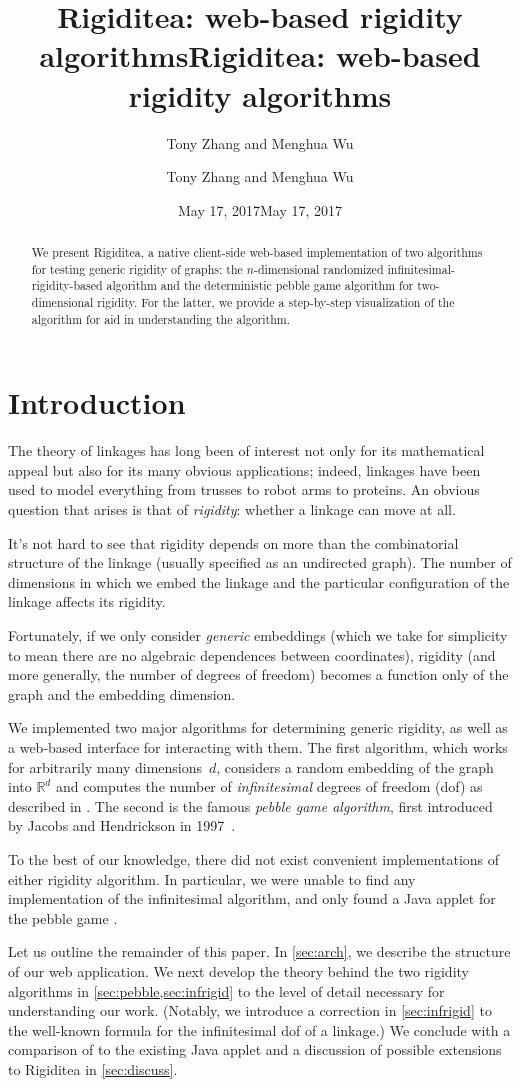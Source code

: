 \documentclass[aps,prd,final,twocolumn,letterpaper,nofootinbib]{revtex4-1}
\title{Rigiditea: web-based rigidity algorithms}
\author{Tony Zhang and Menghua Wu}
\date{May 17, 2017}
\newcommand\RR{\mathbb{R}}
\newcommand\headers{
    \title{Rigiditea: web-based rigidity algorithms}
    \author{Tony Zhang and Menghua Wu}
    \date{May 17, 2017}    
    \begin{abstract}
        We present Rigiditea,
        a native client-side web-based implementation of two algorithms
        for testing generic rigidity of graphs:
        the $n$-dimensional randomized infinitesimal-rigidity-based algorithm
        and the deterministic pebble game algorithm for two-dimensional rigidity.
        For the latter, we provide a step-by-step visualization of the algorithm
        for aid in understanding the algorithm.
    \end{abstract}
}
\begin{document}
\ifrevtex\headers\fi

\maketitle




\tableofcontents

\section{Introduction}

The theory of linkages has long been of interest
not only for its mathematical appeal
but also for its many obvious applications;
indeed, linkages have been used to model everything
from trusses to robot arms to proteins.
An obvious question that arises is that of \emph{rigidity}:
whether a linkage can move at all.

It's not hard to see that rigidity depends on more than
the combinatorial structure of the linkage
(usually specified as an undirected graph).
The number of dimensions in which we embed the linkage
and the particular configuration of the linkage
affects its rigidity.

Fortunately, if we only consider \emph{generic} embeddings
(which we take for simplicity to mean
there are no algebraic dependences between coordinates),
rigidity (and more generally, the number of degrees of freedom)
becomes a function only of the graph and the embedding dimension.

We implemented two major algorithms for determining generic rigidity,
as well as a web-based interface for interacting with them.
The first algorithm, which works for arbitrarily many dimensions~$d$,
considers a random embedding of the graph into $\RR^d$
and computes the number of \emph{infinitesimal} degrees of freedom (dof)
as described in \cite[\S4.4.2]{gfalop}.
The second is the famous \emph{pebble game algorithm},
first introduced by Jacobs and Hendrickson in 1997~\cite{jacobs97}.

To the best of our knowledge,
there did not exist convenient implementations of
either rigidity algorithm.
In particular,
we were unable to find any implementation of the infinitesimal algorithm,
and only found a Java applet for the pebble game \cite{stjohnapplet}.

Let us outline the remainder of this paper.
In \cref{sec:arch}, we describe the structure of our web application.
We next develop the theory behind the two rigidity algorithms
in \cref{sec:pebble,sec:infrigid}
to the level of detail necessary for understanding our work.
(Notably, we introduce a correction in \cref{sec:infrigid}
to the well-known formula for the infinitesimal dof of a linkage.)
We conclude with a comparison of to the existing Java applet
and a discussion of possible extensions to Rigiditea in \cref{sec:discuss}.
\end{document}
